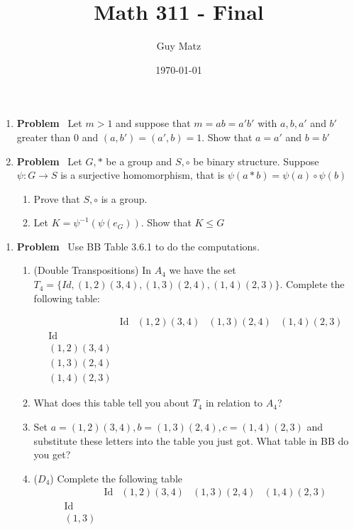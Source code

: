 \documentclass[12pt]{amsart}
\title{\textbf{Math 311 - Final}}
\author{Guy Matz}
\date{\today}
\newcommand{\benu}{\begin{enumerate}}
\newcommand{\eenu}{\end{enumerate}}
\theoremstyle{definition}
\DeclareMathOperator{\Id}{Id}
\newcommand{\itep}{\item {\bfseries Problem}\ }
\begin{document}
 


\begin{enumerate}[series=p]
\itep 
\label{drp}Let $m>1$ and suppose that $m=ab=a'b'$ with $a,b,a'$ and $b'$ greater than $0$ and $(a,b')=(a',b)=1$. Show that  $a=a'$ and $b=b'$

\newpage

\itep
Let $G,\ast$ be a group and $S,\circ$ be binary structure. Suppose $\psi\colon G\to S$ is a surjective homomorphism, that is $\psi(a\ast b)=\psi(a)\circ\psi(b)$
\benu
\item Prove that $S,\circ$ is a group.
\item Let $K=\psi^{-1}(\psi(e_G))$. Show that $K\leq G$
\eenu
\end{enumerate}

\newpage

\begin{enumerate}[resume=p]
\itep \label{D4comp} Use BB Table 3.6.1 to do the computations.
\benu
\item (Double Transpositions) \label{dt} In $A_4$ we have the set $T_4=\{Id,(1,2)(3,4),(1,3)(2,4),(1,4)(2,3)\}$. Complete the following table:

\begin{equation*}
\begin{array}{c|c|c|c|c}
	& \Id	&(1,2)(3,4)&(1,3)(2,4)&(1,4)(2,3)\\
\hline
\Id	&	&	&	&\\
\hline
(1,2)(3,4)	&	&	&	&\\
\hline
(1,3)(2,4)&	&	&	&\\
\hline	
(1,4)(2,3)&	&	&	&
\end{array}				
\end{equation*}
\item What does this table tell you about $T_4$ in relation to $A_4$?
\item Set $a=(1,2)(3,4),b=(1,3)(2,4),c=(1,4)(2,3)$ and substitute these letters into the table you just got. What table in BB do you get?
\item ($D_4$) Complete the following table
\begin{equation*} 
\begin{array}{c|c|c|c|c}
	&\Id	&(1,2)(3,4)	&(1,3)(2,4)	&(1,4)(2,3)	 \\
\hline	
	\Id&	&	&	&	\\
\hline	
	(1,3)&	&	&	&
\end{array}
\end{equation*}

\eenu
\end{enumerate}
\end{document}
